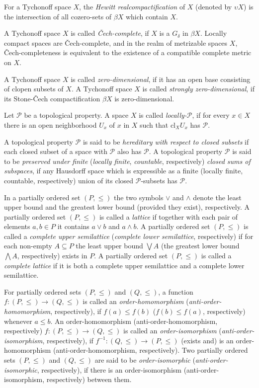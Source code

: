 \documentclass{amsart}
\theoremstyle{definition}
\theoremstyle{remark}
\theoremstyle{notation}
\numberwithin{equation}{section}
\begin{document}
For a Tychonoff space $X$, the {\em Hewitt realcompactification} of $X$ (denoted by $\upsilon X$) is the intersection of all cozero-sets of $\beta X$ which contain $X$.

A Tychonoff space $X$ is called {\em  \v{C}ech-complete}, if $X$ is a $G_\delta$ in $\beta X$.  Locally compact spaces are  \v{C}ech-complete, and in the realm of metrizable spaces $X$, \v{C}ech-completeness is equivalent to the existence of a compatible complete metric on $X$.

A Tychonoff space $X$ is called {\em  zero-dimensional}, if it has an open base consisting of clopen subsets of $X$. A Tychonoff space $X$ is called {\em strongly zero-dimensional}, if its Stone-\v{C}ech compactification $\beta X$ is zero-dimensional.

Let ${\mathcal P}$ be a topological property. A  space $X$ is called {\em locally-${\mathcal P}$}, if for every $x\in X$
there is an open neighborhood $U_x$ of $x$ in $X$ such that $\mbox{cl}_XU_x$ has ${\mathcal P}$.

A topological property $\mathcal{P}$  is said to be {\em hereditary with respect to closed subsets} if each closed subset of a space with $\mathcal{P}$ also has $\mathcal{P}$. A  topological property ${\mathcal P}$ is said to be  {\em preserved under finite} ({\em locally finite}, {\em countable}, respectively)  {\em closed sums of subspaces}, if any
Hausdorff space which is expressible as a  finite (locally finite, countable, respectively) union of its closed
${\mathcal P}$-subsets has ${\mathcal P}$.

In a partially ordered set $(P,\leq)$ the two symbols $\vee$ and $\wedge$ denote the least upper bound and the greatest lower bound (provided they exist), respectively. A partially ordered set $(P,\leq)$ is called a {\em lattice} if together with each pair of elements $a,b\in P$ it contains $a\vee b$ and $a\wedge b$. A partially ordered set $(P,\leq)$ is called a {\em complete upper semilattice} ({\em complete lower semilattice}, respectively)  if for each non-empty $A\subseteq P$ the least upper bound $\bigvee A$ (the greatest lower bound $\bigwedge A$, respectively) exists in $P$. A partially ordered set $(P,\leq)$ is called a {\em complete lattice} if it is both a complete upper semilattice and a complete lower semilattice.

For partially ordered sets $(P,\leq)$ and $(Q,\leq)$, a function $f:(P,\leq)\rightarrow(Q,\leq)$ is called an {\em order-homomorphism} ({\em anti-order-homomorphism}, respectively), if $f(a)\leq f(b)$ ($f(b)\leq f(a)$, respectively) whenever $a\leq b$. An order-homomorphism (anti-order-homomorphism, respectively) $f:(P,\leq)\rightarrow(Q,\leq)$ is called an {\em order-isomorphism} ({\em anti-order-isomorphism}, respectively), if $f^{-1}:(Q,\leq)\rightarrow(P,\leq)$ (exists and) is an order-homomorphism (anti-order-homomorphism, respectively). Two partially ordered sets $(P,\leq)$ and $(Q,\leq)$ are said to be {\em order-isomorphic} ({\em anti-order-isomorphic}, respectively), if there is an  order-isomorphism (anti-order-isomorphism, respectively) between them.
\end{document}
